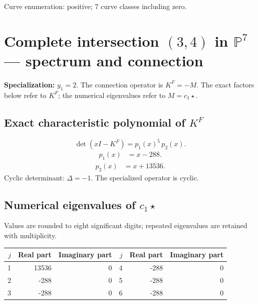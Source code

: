 \documentclass[10pt,a4paper]{article}
\begin{document}
Curve enumeration: positive; 7 curve classes including zero.
\clearpage\section*{Complete intersection $(3,4)$ in $\mathbb P^{7}$ --- spectrum and connection}
\textbf{Specialization:} $y_1=2$. The connection operator is $K^F=-M$. The exact factors below refer to $K^F$; the numerical eigenvalues refer to $M=c_1\star$.
\subsection*{Exact characteristic polynomial of $K^F$}
\[\det(xI-K^F)=p_{1}(x)^{5}\,p_{2}(x).\]
\[\begin{aligned}p_{1}(x)&=x - 288.\end{aligned}\]
\[\begin{aligned}p_{2}(x)&=x + 13536.\end{aligned}\]
Cyclic determinant: $\Delta=-1$. The specialized operator is cyclic.
\subsection*{Numerical eigenvalues of $c_1\star$}
Values are rounded to eight significant digits; repeated eigenvalues are retained with multiplicity.
\begin{center}\small\begin{tabular}{rrr@{\qquad}rrr}\toprule $j$ & Real part & Imaginary part & $j$ & Real part & Imaginary part\\\midrule
1 & 13536 & 0 & 4 & -288 & 0\\
2 & -288 & 0 & 5 & -288 & 0\\
3 & -288 & 0 & 6 & -288 & 0\\
\bottomrule\end{tabular}\end{center}
\end{document}
